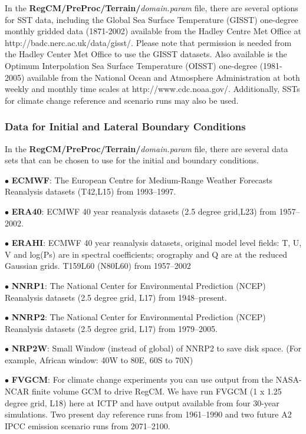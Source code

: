 In the {\bf RegCM/PreProc/Terrain/}{\it domain.param} file, there are several 
options for SST data, including the Global Sea Surface Temperature (GISST) 
one-degree monthly gridded data (1871-2002) available from the Hadley Centre 
Met Office at http://badc.nerc.ac.uk/data/gisst/. Please note that permission is needed from the Hadley Center Met Office to use the GISST datasets. Also available is the 
Optimum Interpolation Sea Surface Temperature (OISST) one-degree (1981-2005) available from the National Ocean and Atmosphere Administration at both weekly and monthly time scales at http://www.cdc.noaa.gov/. Additionally, SSTs for climate change reference and scenario runs may also be used.

\subsubsection{Data for Initial and Lateral Boundary Conditions}

In the {\bf RegCM/PreProc/Terrain/}{\it domain.param} file, there are several data sets that can be chosen to use for the initial and boundary conditions.  

$\bullet$  {\bf ECMWF}:  The European Centre for Medium-Range Weather Forecasts
Reanalysis datasets (T42,L15) from 1993--1997. 

$\bullet$  {\bf ERA40}:  ECMWF 40 year reanalysis datasets (2.5 degree grid,L23) from 1957--2002. 

$\bullet$  {\bf ERAHI}: ECMWF 40 year reanalysis datasets, original model level fields:
 T, U, V and log(Ps) are in spectral coefficients; orography and Q are at the reduced Gaussian grids. T159L60 (N80L60) from 1957--2002 

$\bullet$  {\bf NNRP1}:  The National Center for Environmental Prediction  (NCEP) 
Reanalysis datasets (2.5 degree grid, L17) from 1948--present. 

$\bullet$  {\bf NNRP2}:  The National Center for Environmental Prediction  (NCEP) 
Reanalysis datasets (2.5 degree grid, L17) from 1979--2005. 

$\bullet$  {\bf NRP2W}: Small Window (instead of global) of NNRP2 to save disk space. (For example, African window: 40W to 80E, 60S to 70N) 

$\bullet$  {\bf FVGCM}:  For climate change experiments you can use output from the NASA-NCAR finite volume GCM to drive RegCM.  We have run FVGCM (1 x 1.25 degree grid, L18) here at ICTP and have output available from four 30-year simulations. Two present day reference runs from 1961--1990 and two future A2 IPCC emission scenario runs from 2071--2100.  

